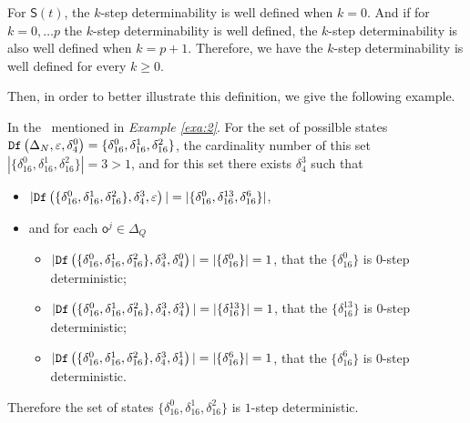 For $\mathsf{S}(t)$, the $k$-step determinability is well defined when $k=0$. And if for $k=0,\ldots p$ the $k$-step determinability is well defined, the $k$-step determinability is also well defined when $k=p+1$. Therefore, we have the $k$-step determinability is well defined for every $k\ge 0$.
 
 Then, in order to better illustrate this definition, we give the following example.
\begin{example}
In the \BCN\ mentioned in {\em Example \ref{exa:2}}. For the set of possilble states ${\tt Df}\left(\Delta_N,\varepsilon,\delta_4^0\right)=\{\delta_{16}^0,\delta_{16}^1,\delta_{16}^2\}$, the cardinality number of this set $|\{\delta_{16}^0,\delta_{16}^1,\delta_{16}^2\}|=3>1$, and for this set there exists $\delta_{4}^3$ such that 
 \begin{itemize}
 \item  $|{\tt Df}\left(\{\delta_{16}^0,\delta_{16}^1,\delta_{16}^2\},\delta_{4}^3,\varepsilon\right)|=|\{\delta_{16}^0,\delta_{16}^{13},\delta_{16}^6\}|$,
 \item   and for each $\mathsf{o}^{j}\in \Delta_Q$
  \begin{itemize}
  \item   $|{\tt Df}\left(\{\delta_{16}^0,\delta_{16}^1,\delta_{16}^2\},\delta_{4}^3,\delta_{4}^0\right)|=|\{\delta_{16}^0\}|=1$, that the $\{\delta_{16}^0\}$ is $0$-step deterministic;
 \item  $|{\tt Df}\left(\{\delta_{16}^0,\delta_{16}^1,\delta_{16}^2\},\delta_{4}^3,\delta_{4}^3\right)|=|\{\delta_{16}^{13}\}|=1$, that the $\{\delta_{16}^{13}\}$ is $0$-step deterministic;
  \item  $|{\tt Df}\left(\{\delta_{16}^0,\delta_{16}^1,\delta_{16}^2\},\delta_{4}^3,\delta_{4}^1\right)|=|\{\delta_{16}^{6}\}|=1$, that the $\{\delta_{16}^{6}\}$ is $0$-step deterministic.
 \end{itemize}
 \end{itemize}
 Therefore the set of states $\{\delta_{16}^0,\delta_{16}^1,\delta_{16}^2\}$ is $1$-step deterministic.
\label{exa:9}
\end{example}  

